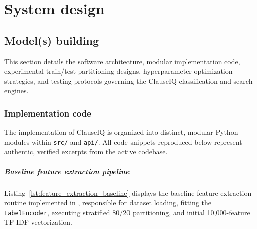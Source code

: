 \chapter{System design}
\label{ch:system_design}

\section{Model(s) building}
\label{sec:models_building}

This section details the software architecture, modular implementation code, experimental train/test partitioning designs, hyperparameter optimization strategies, and testing protocols governing the ClauseIQ classification and search engines.

\subsection{Implementation code}
\label{subsec:implementation_code}

The implementation of ClauseIQ is organized into distinct, modular Python modules within \texttt{src/} and \texttt{api/}. All code snippets reproduced below represent authentic, verified excerpts from the active codebase.

\paragraph*{Baseline feature extraction pipeline}
Listing~\ref{lst:feature_extraction_baseline} displays the baseline feature extraction routine implemented in , responsible for dataset loading, fitting the \texttt{LabelEncoder}, executing stratified 80/20 partitioning, and initial 10,000-feature TF-IDF vectorization.

